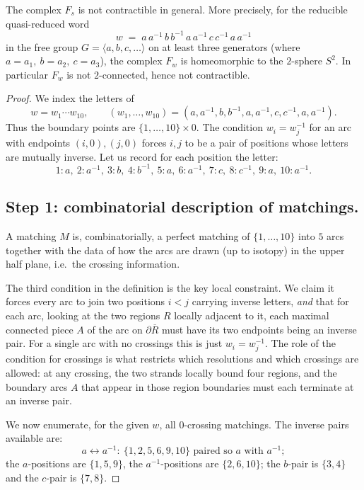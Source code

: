 \begin{theorem}
The complex $F_s$ is not contractible in general. More precisely, for the
reducible quasi-reduced word
\[
  w \;=\; a\,a^{-1}\,b\,b^{-1}\,a\,a^{-1}\,c\,c^{-1}\,a\,a^{-1}
\]
in the free group $G=\langle a,b,c,\dots\rangle$ on at least three generators
(where $a=a_1,\ b=a_2,\ c=a_3$), the complex $F_w$ is homeomorphic to the
$2$-sphere $S^2$. In particular $F_w$ is not $2$-connected, hence not
contractible.
\end{theorem}

\begin{proof}
We index the letters of
\[
  w=w_1\cdots w_{10},\qquad
  (w_1,\dots,w_{10})=(a,a^{-1},b,b^{-1},a,a^{-1},c,c^{-1},a,a^{-1}).
\]
Thus the boundary points are $\{1,\dots,10\}\times 0$. The condition
$w_i=w_j^{-1}$ for an arc with endpoints $(i,0),(j,0)$ forces $i,j$ to be a
pair of positions whose letters are mutually inverse. Let us record for each
position the letter:
\[
  1\!:a,\ 2\!:a^{-1},\ 3\!:b,\ 4\!:b^{-1},\ 5\!:a,\ 6\!:a^{-1},\ 7\!:c,\
  8\!:c^{-1},\ 9\!:a,\ 10\!:a^{-1}.
\]

\subsection*{Step 1: combinatorial description of matchings.}
A matching $M$ is, combinatorially, a perfect matching of $\{1,\dots,10\}$
into $5$ arcs together with the data of how the arcs are drawn (up to
isotopy) in the upper half plane, i.e.\ the crossing information.

The third condition in the definition is the key local constraint. We claim
it forces every arc to join two positions $i<j$ carrying inverse letters,
\emph{and} that for each arc, looking at the two regions $R$ locally adjacent
to it, each maximal connected piece $A$ of the arc on $\partial\overline R$
must have its two endpoints being an inverse pair. For a single arc with no
crossings this is just $w_i=w_j^{-1}$. The role of the condition for
crossings is what restricts which resolutions and which crossings are allowed:
at any crossing, the two strands locally bound four regions, and the boundary
arcs $A$ that appear in those region boundaries must each terminate at an
inverse pair.

We now enumerate, for the given $w$, all $0$-crossing matchings. The inverse
pairs available are:
\[
  a\!\leftrightarrow\! a^{-1}:\ \{1,2,5,6,9,10\}\text{ paired so $a$ with
  }a^{-1};
\]
the $a$-positions are $\{1,5,9\}$, the $a^{-1}$-positions are $\{2,6,10\}$;
the $b$-pair is $\{3,4\}$ and the $c$-pair is $\{7,8\}$.


\end{proof}
